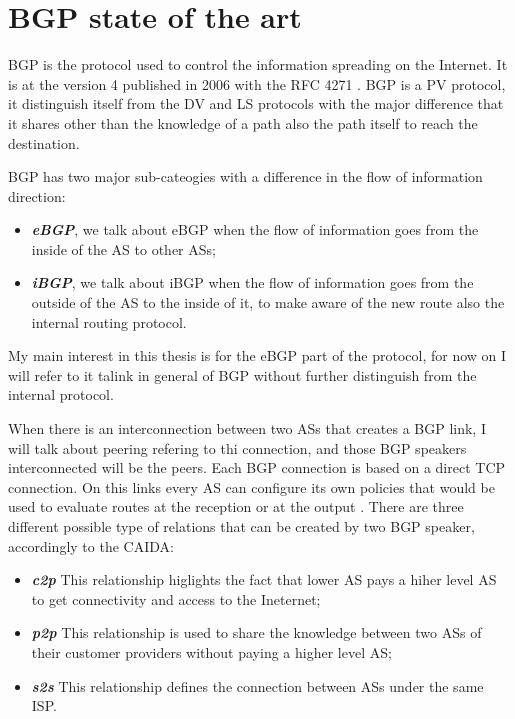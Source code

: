 \chapter{BGP state of the art}
\label{cha:bgp_art}

\ac{BGP} is the protocol used to control the information spreading on the Internet.
It is at the version \num{4} published in \num{2006} with the \ac{RFC} \num{4271}
\cite{rfc4271}.
\ac{BGP} is a \ac{PV} protocol, it distinguish itself from the \ac{DV} and \ac{LS}
protocols with the major difference that it shares other than the knowledge of
a path also the path itself to reach the destination.

\ac{BGP} has two major sub-cateogies with a difference in the flow of information
direction:
\begin{itemize}
	\item \textbf{\textit{\ac{eBGP}}}, we talk about \ac{eBGP} when the
		flow of information goes from the inside
		of the \ac{AS} to other \acp{AS};
	\item \textbf{\textit{\ac{iBGP}}}, we talk about \ac{iBGP} when the flow
		of information goes from the outside of the \ac{AS} to the inside of
		it, to make aware of the new route also the internal routing protocol.
\end{itemize}

My main interest in this thesis is for the \ac{eBGP} part of the protocol, for
now on I will refer to it talink in general of \ac{BGP} without further distinguish
from the internal protocol.

When there is an interconnection between two \acp{AS} that creates a \ac{BGP}
link, I will talk about peering refering to thi connection, and those \ac{BGP} 
speakers interconnected will be the peers.
Each \ac{BGP} connection is based on a direct \ac{TCP} connection.
On this links every \ac{AS} can configure its own policies that would be used
to evaluate routes at the reception or at the output .
There are three different possible type of relations that can be created by two
\ac{BGP} speaker, accordingly to the \ac{CAIDA}:

\begin{itemize}
	\item \textbf{\textit{\ac{c2p}}} This relationship higlights the fact that
		lower \ac{AS} pays a hiher level \ac{AS} to get connectivity and access
		to the Ineternet;
	\item \textbf{\textit{\ac{p2p}}} This relationship is used to share the knowledge
		between two \acp{AS} of their customer providers without paying a higher
		level \ac{AS};
	\item \textbf{\textit{\ac{s2s}}} This relationship defines the connection 
		between \acp{AS} under the same \ac{ISP}.
\end{itemize}

